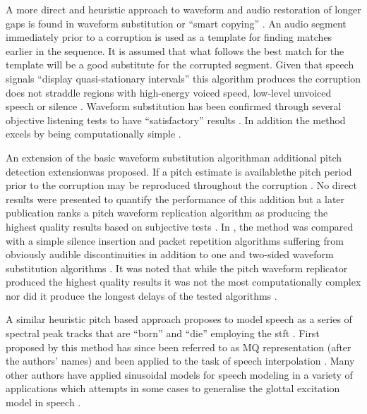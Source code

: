 A more direct and heuristic approach to waveform and audio restoration of longer gaps is found in waveform substitution \cite{Goodman1986} or ``smart copying'' \cite{Niediwiecki2001}. An audio segment immediately prior to a corruption is used as a template for finding \DIFdelbegin {}\DIFdelend matches earlier in the sequence. It is assumed that what follows the best match for the template will be a good substitute for the corrupted segment. Given that speech signals ``display quasi-stationary intervals'' \cite{Goodman1986} this algorithm produces \DIFdelbegin {}\DIFdelend \DIFaddbegin {}\DIFaddend the corruption does not straddle regions with high-energy voiced speed, low-level unvoiced speech or silence \cite{Goodman1986}. Waveform substitution has been confirmed through several objective listening tests to have ``satisfactory'' results \cite{Niediwiecki2001}. In addition the method excels by being computationally simple \cite{Niediwiecki2001}.

An extension of the basic waveform substitution algorithm\DIFaddbegin \DIFadd{, }\DIFaddend an additional pitch detection extension\DIFaddbegin \DIFadd{, }\DIFaddend was proposed. If a pitch estimate is available\DIFaddbegin \DIFadd{, }\DIFaddend the pitch period prior to the corruption may be reproduced throughout the corruption \cite{Goodman1986}. No direct results were presented to quantify the performance of this addition but a later publication ranks a pitch waveform replication algorithm as producing the highest quality results based on subjective tests \cite{Wasem1988}. In \DIFdelbegin {}\DIFdelend \DIFaddbegin {}\DIFaddend , the method was compared with a simple silence insertion and packet repetition algorithms suffering from obviously audible discontinuities \cite{Goodman1986} in addition to one and two-sided waveform substitution algorithms \cite{Goodman1986}. It was noted that while the pitch waveform replicator produced the highest quality results it was not the most computationally complex nor did it produce the longest delays of the tested algorithms \cite{Wasem1988}.

A similar heuristic pitch based approach proposes to model speech as a series of spectral peak tracks that are ``born'' and ``die'' employing the \DIFdelbegin {}\DIFdelend \DIFaddbegin \gls{stft} \DIFaddend \cite{Maher1994}. First proposed by \cite{McAulay1986} this method has since been referred to as MQ representation (after the authors' names) and been applied to the task of speech interpolation \cite{Maher1994}. Many other authors have applied sinusoidal models for speech modeling in a variety of applications \cite{Godsill1998book}\cite{Vera-Candeas2003}\cite{Wells2006} which attempts in some cases to generalise the glottal excitation model in speech \cite{McAulay1986}.


